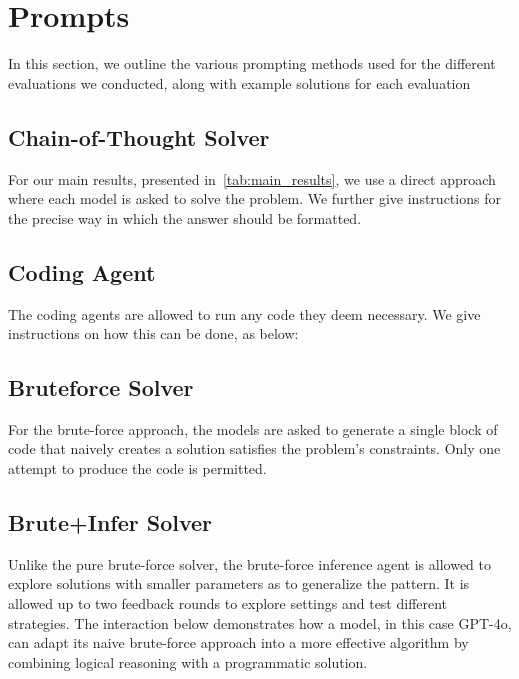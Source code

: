 \section{Prompts} \label{app:prompts}

In this section, we outline the various prompting methods used for the different evaluations we conducted, along with example solutions for each evaluation

\subsection{Chain-of-Thought Solver}
For our main results, presented in~\cref{tab:main_results}, we use a direct approach where each model is asked to solve the problem. We further give instructions for the precise way in which the answer should be formatted. 



\newpage

\subsection{Coding Agent}
The coding agents are allowed to run any code they deem necessary. We give instructions on how this can be done, as below:



\subsection{Bruteforce Solver}
For the brute-force approach, the models are asked to generate a single block of code that naively creates a solution satisfies the problem's constraints. Only one attempt to produce the code is permitted.


\subsection{Brute+Infer Solver}
Unlike the pure brute-force solver, the brute-force inference agent is allowed to explore solutions with smaller parameters as to generalize the pattern. It is allowed up to two feedback rounds to explore settings and test different strategies. The interaction below demonstrates how a model, in this case GPT-4o, can adapt its naive brute-force approach into a more effective algorithm by combining logical reasoning with a programmatic solution.
   
